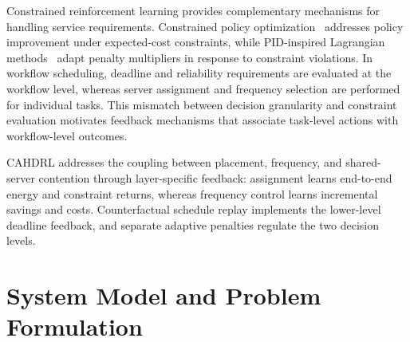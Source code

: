 \documentclass[journal]{IEEEtran}
\begin{document}
Constrained reinforcement learning provides complementary mechanisms for handling service requirements. Constrained policy optimization~\cite{achiam2017} addresses policy improvement under expected-cost constraints, while PID-inspired Lagrangian methods~\cite{stooke2020} adapt penalty multipliers in response to constraint violations. In workflow scheduling, deadline and reliability requirements are evaluated at the workflow level, whereas server assignment and frequency selection are performed for individual tasks. This mismatch between decision granularity and constraint evaluation motivates feedback mechanisms that associate task-level actions with workflow-level outcomes.

CAHDRL addresses the coupling between placement, frequency, and shared-server contention through layer-specific feedback: assignment learns end-to-end energy and constraint returns, whereas frequency control learns incremental savings and costs. Counterfactual schedule replay implements the lower-level deadline feedback, and separate adaptive penalties regulate the two decision levels.

\section{System Model and Problem Formulation}
\label{sec:model}
\end{document}
